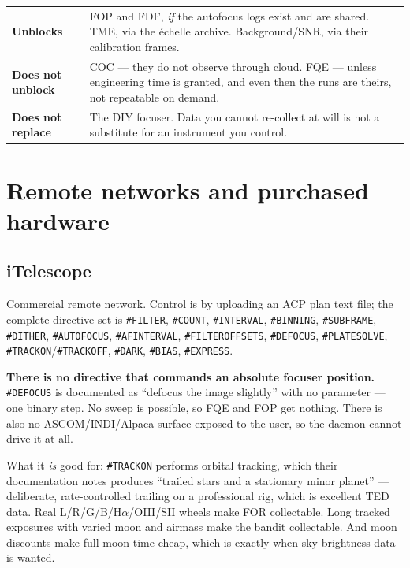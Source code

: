 \documentclass[11pt]{article}
\newcommand{\co}[1]{\texttt{\small #1}}
\begin{document}
\begin{center}
\small
\begin{tabular}{@{}p{}p{}@{}}
\toprule
\textbf{Unblocks} & FOP and FDF, \emph{if} the autofocus logs exist and are shared. TME, via the \'echelle archive. Background/SNR, via their calibration frames. \\
\addlinespace
\textbf{Does not unblock} & COC --- they do not observe through cloud. FQE --- unless engineering time is granted, and even then the runs are theirs, not repeatable on demand. \\
\addlinespace
\textbf{Does not replace} & The DIY focuser. Data you cannot re-collect at will is not a substitute for an instrument you control. \\
\bottomrule
\end{tabular}
\end{center}

\section{Remote networks and purchased hardware}

\subsection{iTelescope}

Commercial remote network. Control is by uploading an ACP plan text file; the
complete directive set is \co{\#FILTER}, \co{\#COUNT}, \co{\#INTERVAL},
\co{\#BINNING}, \co{\#SUBFRAME}, \co{\#DITHER}, \co{\#AUTOFOCUS},
\co{\#AFINTERVAL}, \co{\#FILTEROFFSETS}, \co{\#DEFOCUS}, \co{\#PLATESOLVE},
\co{\#TRACKON}/\co{\#TRACKOFF}, \co{\#DARK}, \co{\#BIAS}, \co{\#EXPRESS}.

\begin{warnbox}
\textbf{There is no directive that commands an absolute focuser position.}
\co{\#DEFOCUS} is documented as ``defocus the image slightly'' with no
parameter --- one binary step. No sweep is possible, so FQE and FOP get nothing.
There is also no ASCOM/INDI/Alpaca surface exposed to the user, so the daemon
cannot drive it at all.
\end{warnbox}

What it \emph{is} good for: \co{\#TRACKON} performs orbital tracking, which
their documentation notes produces ``trailed stars and a stationary minor
planet'' --- deliberate, rate-controlled trailing on a professional rig, which is
excellent TED data. Real L/R/G/B/H$\alpha$/OIII/SII wheels make FOR collectable.
Long tracked exposures with varied moon and airmass make the bandit collectable.
And moon discounts make full-moon time cheap, which is exactly when
sky-brightness data is wanted.
\end{document}
